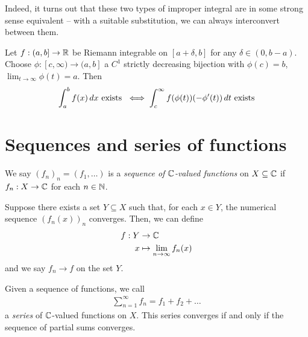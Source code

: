 \documentclass{../../template/note}
\begin{document}
    Indeed, it turns out that these two types of improper integral are in some strong sense equivalent -- with a suitable substitution, we can always interconvert between them.

    \begin{lemma}
        Let \(f: (a, b] \to \mathbb R\) be Riemann integrable on \([a+\delta, b]\) for any \(\delta \in (0, b-a)\). Choose \(\phi: [c, \infty) \to (a, b]\) a \(C^1\) strictly decreasing bijection with \(\phi(c) = b\), \(\lim_{t \to \infty}\phi(t) = a\). Then
        \begin{align*}
            \int_a^b f(x) \,d{x} \text{ exists } \iff \int_c^\infty f(\phi(t))(-\phi'(t)) \,d{t} \text{ exists}
        \end{align*}
    \end{lemma}
    

    \section{Sequences and series of functions}

    \begin{definition}
        We say \((f_n)_n = (f_1, \dots)\) is a \emph{sequence of \(\mathbb C\)-valued functions} on \(X \subseteq \mathbb C\) if \(f_n: X \to \mathbb C\) for each \(n \in \mathbb N\). 
    \end{definition}

    \begin{definition}
        Suppose there exists a set \(Y \subseteq X\) such that, for each \(x \in Y\), the numerical sequence \((f_n(x))_n\) converges. Then, we can define
        \begin{align*}
            f: Y &\to \mathbb C \\
            x &\mapsto \lim_{n \to \infty} f_n(x)
        \end{align*}
        and we say \(f_n \to f\) on the set \(Y\).        
    \end{definition}
    
    \begin{definition}
        Given a sequence of functions, we call
        \begin{align*}
            \sum_{n=1}^\infty f_n = f_1 + f_2 + \dots
        \end{align*}
        a \emph{series} of \(\mathbb C\)-valued functions on \(X\). This series converges if and only if the sequence of partial sums converges.    
    \end{definition}
    
\end{document}
